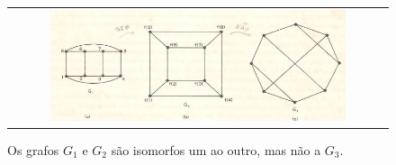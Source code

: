\begin{figure}[hb]
  \begin{center}
    \begin{tabular}{c}
      \includegraphics[width=0.8\textwidth]{images/02/fig2.png}
    \end{tabular}
  \end{center}
  \caption{\label{fig:2} Os grafos $G_1$ e $G_2$ são isomorfos um ao outro, mas não a $G_3$.}
\end{figure}



